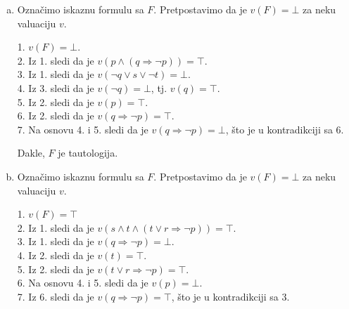 \begin{enumerate}[(a)]
1. Pretpostavimo da je $v(F)=\bot$.\\
2. Iz 1. sledi $v(s\wedge p\wedge (s\vee \neg r\Rightarrow (\neg q\vee t)))=\top$.\\
3. Iz 1. sledi da je $v(q\Rightarrow t)=\bot$.\\
4. Iz 3. sledi da je $v(q)=\top$.\\
5. Iz 3. sledi da je $v(t)=\bot$.\\
6. Iz 2. sledi da je $v(s)=\top$.\\
7. Iz 2. sledi da je $v(p)=\top$.\\
8. Iz 2. sledi da je $v(s\vee \neg r\Rightarrow (\neg q\vee t))=\top$.\\
9. Iz 6. sledi da je $v(s\vee \neg r)=\top$.\\
10. Na osnovu 8. i 9. sledi da je $v(\neg q\vee t)=\top$.\\
11. Na osnovu 4. i 5. sledi da je $v(\neg q\vee t)=\bot$, \v sto je u kontradikciji sa 10, \v cime je dokazano da je $F$ tautologija.

\item Ozna\v cimo iskaznu formulu sa $F$. Pretpostavimo da je $v(F)=\bot$ za neku valuaciju $v$.

1. $v(F)=\bot$.\\
2. Iz 1. sledi da je $v(p\wedge (q\Rightarrow \neg p))=\top$.\\
3. Iz 1. sledi da je $v(\neg q\vee s\vee \neg t)=\bot$.\\
4. Iz 3. sledi da je $v(\neg q)=\bot$, tj. $v(q)=\top$.\\
5. Iz 2. sledi da je $v(p)=\top$.\\
6. Iz 2. sledi da je $v(q\Rightarrow\neg p)=\top$.\\
7. Na osnovu 4. i 5. sledi da je $v(q\Rightarrow\neg p)=\bot$, \v sto je u kontradikciji sa 6.

Dakle, $F$ je tautologija.

\item Ozna\v cimo iskaznu formulu sa $F$. Pretpostavimo da je $v(F)=\bot$ za neku valuaciju $v$.

1. $v(F)=\top$\\
2. Iz 1. sledi da je $v(s\wedge t\wedge(t\vee r\Rightarrow \neg p))=\top$.\\
3. Iz 1. sledi da je $v(q\Rightarrow \neg p)=\bot$.\\
4. Iz 2. sledi da je $v(t)=\top$.\\
5. Iz 2. sledi da je $v(t\vee r\Rightarrow \neg p)=\top$.\\
6. Na osnovu 4. i 5. sledi da je $v(p)=\bot$.\\
7. Iz 6. sledi da je $v(q\Rightarrow \neg p)=\top$, \v sto je u kontradikciji sa 3.


\end{enumerate}
